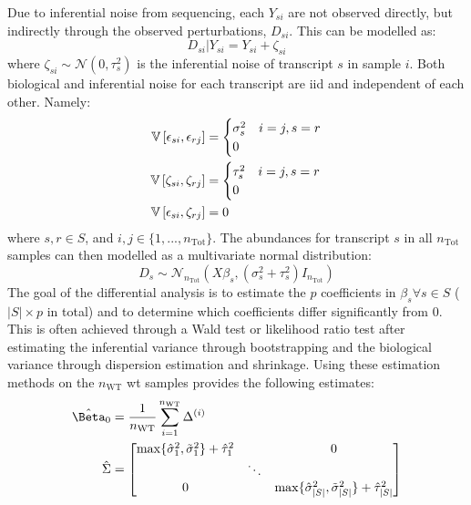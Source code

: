 Due to inferential noise from sequencing, each $Y_{si}$ are not observed directly, but indirectly through the observed perturbations, $D_{si}$.
This can be modelled as:
%
\begin{equation}
  D_{si} | Y_{si} = Y_{si} + \zeta_{si}
\end{equation}
%
where $\zeta_{si} \sim \mathcal{N}(0, \tau_s^2)$ is the inferential noise of transcript $s$ in sample $i$.
Both biological and inferential noise for each transcript are \gls{iid} and independent of each other.
Namely:
%
\begin{align}
  \mathbb{V} \left[ \epsilon_{si}, \epsilon_{rj} \right] & =
  \begin{cases}
    \sigma_s^2 & i = j, s = r \\
    0
  \end{cases}                     \\
  \mathbb{V} \left[ \zeta_{si}, \zeta_{rj} \right]       & =
  \begin{cases}
    \tau_s^2 & i = j, s = r \\
    0
  \end{cases}                     \\
  \mathbb{V} \left[ \epsilon_{si}, \zeta_{rj} \right]    & = 0
\end{align}
%
where $s, r \in S$, and $i, j \in \{1, ..., n_\mathrm{Tot} \}$.
The abundances for transcript $s$ in all $n_\mathrm{Tot}$ samples can then modelled as a multivariate normal distribution:
%
\begin{equation}
  D_{s} \sim \mathcal{N}_{n_\mathrm{Tot}}(X \beta_s, (\sigma_s^2 + \tau_s^2)I_{n_\mathrm{Tot}})
\end{equation}
%
The goal of the differential analysis is to estimate the $p$ coefficients in $\beta_s \forall s \in S$ ($|S| \times p$ in total) and to determine which coefficients differ significantly from 0.
This is often achieved through a Wald test or likelihood ratio test after estimating the inferential variance through bootstrapping and the biological variance through dispersion estimation and shrinkage.
Using these estimation methods on the $n_\mathrm{WT}$ \gls{wt} samples provides the following estimates:
\begin{align*}
  \hat{\Beta}_0 & = \frac{1}{n_\mathrm{WT}} \sum_{i = 1}^{n_\mathrm{WT}} \Delta^{(i)} \\
  \hat{\Sigma}  & = \begin{bmatrix}
    \max\{\hat{\sigma}_1^2, \tilde{\sigma}_1^2\} + \hat{\tau}_1^2 &        & 0                                                                         \\
                                                                  & \ddots                                                                             \\
    0                                                             &        & \max\{\hat{\sigma}_{|S|}^2, \tilde{\sigma}_{|S|}^2\} + \hat{\tau}_{|S|}^2 \\
  \end{bmatrix}
\end{align*}
